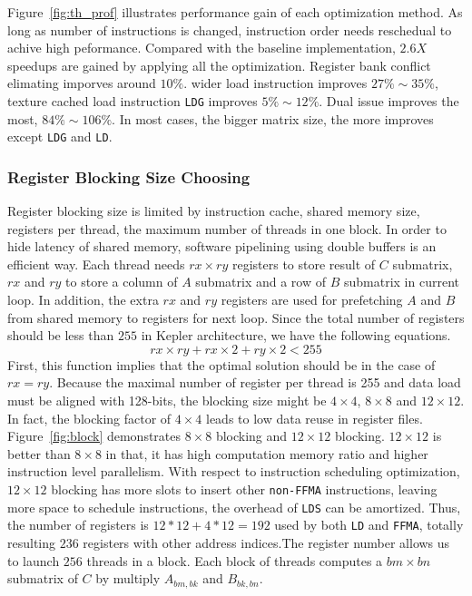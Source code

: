\documentclass{sig-alternate-05-2015}
\begin{document}
Figure~\ref{fig:th_prof} illustrates performance gain of each optimization method.
As long as number of instructions is changed, instruction order needs reschedual to achive high peformance.
Compared with the baseline implementation, $2.6X$ speedups are gained by applying all the optimization.
Register bank conflict elimating imporves around $10\%$. wider load instruction improves $27\%\sim35\%$, texture cached
load instruction {\tt LDG} improves $5\%\sim12\%$. Dual issue improves the most, $84\%\sim106\%$. In most cases, the bigger matrix
size, the more improves except {\tt LDG} and {\tt LD}.

\subsubsection{Register Blocking Size Choosing}

Register blocking size is limited by instruction cache, shared memory size, registers per thread, the maximum number of threads in one block. 
In order to hide latency of shared memory, software pipelining using double
buffers is an efficient way. Each thread needs $rx\times ry$ registers to store result of $C$ submatrix, $rx$ and $ry$ to store a column of $A$
submatrix and a row of $B$ submatrix in current loop. In addition, the extra $rx$ and $ry$ registers are used for prefetching $A$ and $B$ from shared memory to
registers for next loop. Since the total number of registers should be less than $255$ in Kepler architecture, we have the following equations.
\begin{equation}
    rx\times ry + rx\times 2 + ry\times 2 < 255
\label{f_register}
\end{equation}
First, this function implies that the optimal solution should be in the case of $rx=ry$. Because the maximal number of register per thread is 255 and data load must be aligned with 128-bits, the blocking size might be $4\times 4$, $8\times 8$ and $12\times 12$. In fact, the blocking factor of $4\times 4$ leads to low data reuse in register files. Figure~\ref{fig:block} demonstrates $8\times8$ blocking and $12\times12$ blocking. $12\times12$ is better than
$8\times8$ in that, it has high computation memory ratio and higher instruction level parallelism. With respect to instruction scheduling optimization, $12\times12$ blocking has more slots to insert other {\tt non-FFMA} instructions, leaving more
space to schedule instructions, the overhead of {\tt LDS} can be amortized. Thus, the number of registers is $12*12+4*12=192$ used by both {\tt LD} and {\tt FFMA}, totally resulting $236$ registers with other address indices.The register number allows us to launch $256$ threads in a block. Each block of threads computes a $bm\times bn$ submatrix of $C$ by multiply $A_{bm,bk}$ and $B_{bk,
bn}$. 
\end{document}
